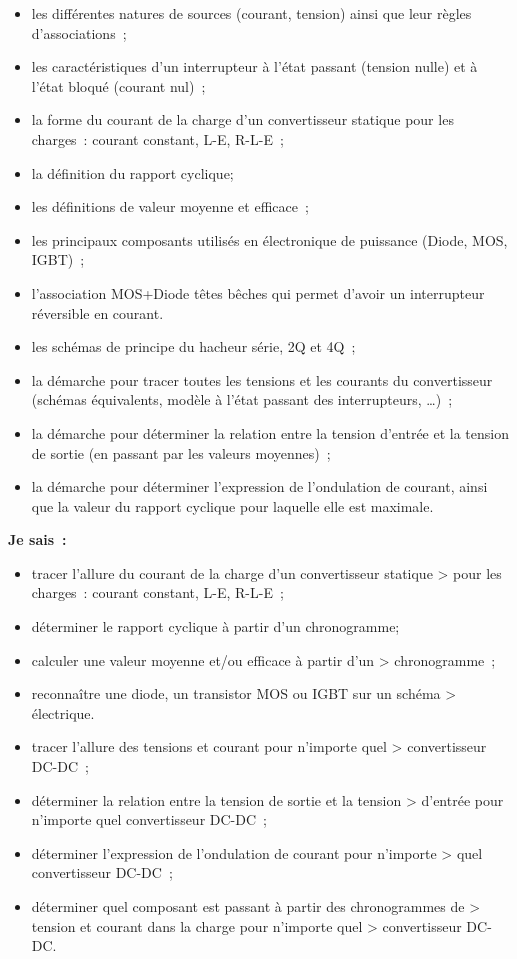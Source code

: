 \begin{itemize}
\item
  les différentes natures de sources (courant, tension) ainsi que leur règles d'associations~; ⃝
\item
  les caractéristiques d'un interrupteur à l'état passant (tension nulle) et à l'état bloqué (courant nul)~; ⃝
\item
  la forme du courant de la charge d'un convertisseur statique pour les charges~: courant constant, L-E, R-L-E~; ⃝
\item
  la définition du rapport cyclique; ⃝
\item
  les définitions de valeur moyenne et efficace~; ⃝
\item
  les principaux composants utilisés en électronique de puissance (Diode, MOS, IGBT)~; ⃝
\item
  l'association MOS+Diode têtes bêches qui permet d'avoir un interrupteur réversible en courant. ⃝
\item
  les schémas de principe du hacheur série, 2Q et 4Q~; ⃝
\item
  la démarche pour tracer toutes les tensions et les courants du convertisseur (schémas équivalents, modèle à l'état passant des interrupteurs, \ldots)~; ⃝
\item
  la démarche pour déterminer la relation entre la tension d'entrée et la tension de sortie (en passant par les valeurs moyennes)~; ⃝
\item
  la démarche pour déterminer l'expression de l'ondulation de courant, ainsi que la valeur du rapport cyclique pour laquelle elle est maximale. ⃝
\end{itemize}

\textbf{Je sais~:}

\begin{itemize}
\item
  tracer l'allure du courant de la charge d'un convertisseur statique \textgreater{} pour les charges~: courant constant, L-E, R-L-E~; ⃝
\item
  déterminer le rapport cyclique à partir d'un chronogramme; ⃝
\item
  calculer une valeur moyenne et/ou efficace à partir d'un \textgreater{} chronogramme~;~ ⃝
\item
  reconnaître une diode, un transistor MOS ou IGBT sur un schéma \textgreater{} électrique. ⃝
\item
  tracer l'allure des tensions et courant pour n'importe quel \textgreater{} convertisseur DC-DC~; ⃝
\item
  déterminer la relation entre la tension de sortie et la tension \textgreater{} d'entrée pour n'importe quel convertisseur DC-DC~; ⃝
\item
  déterminer l'expression de l'ondulation de courant pour n'importe \textgreater{} quel convertisseur DC-DC~; ⃝
\item
  déterminer quel composant est passant à partir des chronogrammes de \textgreater{} tension et courant dans la charge pour n'importe quel \textgreater{} convertisseur DC-DC. ⃝
\end{itemize}

